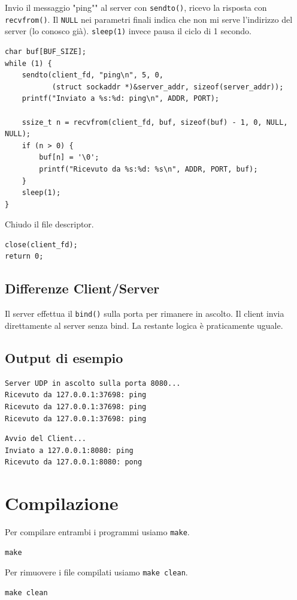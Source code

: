 \documentclass[a4paper,12pt]{article}
\begin{document}
\newpage
Invio il messaggio "ping"" al server con \texttt{sendto()},
ricevo la risposta con \texttt{recvfrom()}.
Il \texttt{NULL} nei parametri finali indica che non mi serve l'indirizzo
del server (lo conosco già).
\newline
\texttt{sleep(1)} invece pausa il ciclo di 1 secondo.
\begin{lstlisting}[caption={client\_udp.c - Invio/Ricezione}]
char buf[BUF_SIZE];
while (1) {
    sendto(client_fd, "ping\n", 5, 0,
           (struct sockaddr *)&server_addr, sizeof(server_addr));
    printf("Inviato a %s:%d: ping\n", ADDR, PORT);
    
    ssize_t n = recvfrom(client_fd, buf, sizeof(buf) - 1, 0, NULL, NULL);
    if (n > 0) {
        buf[n] = '\0';
        printf("Ricevuto da %s:%d: %s\n", ADDR, PORT, buf);
    }
    sleep(1);
}
\end{lstlisting}
\FloatBarrier

Chiudo il file descriptor.
\begin{lstlisting}[caption={client\_udp.c - Chiusura}]
close(client_fd);
return 0;
\end{lstlisting}
\FloatBarrier

\subsection{Differenze Client/Server}
Il server effettua il \texttt{bind()} sulla porta per rimanere in ascolto. Il client invia direttamente al server senza bind. La restante logica è praticamente uguale.

\subsection{Output di esempio}
\begin{lstlisting}[caption={Output server}]
Server UDP in ascolto sulla porta 8080...
Ricevuto da 127.0.0.1:37698: ping
Ricevuto da 127.0.0.1:37698: ping
Ricevuto da 127.0.0.1:37698: ping
\end{lstlisting}
\FloatBarrier

\begin{lstlisting}[caption={Output client}]
Avvio del Client...
Inviato a 127.0.0.1:8080: ping
Ricevuto da 127.0.0.1:8080: pong
\end{lstlisting}
\FloatBarrier

\section{Compilazione}
Per compilare entrambi i programmi usiamo \texttt{make}.
\begin{lstlisting}[caption={Compilazione}]
make
\end{lstlisting}
\FloatBarrier
Per rimuovere i file compilati usiamo \texttt{make clean}.
\begin{lstlisting}[caption={Clean}]
make clean
\end{lstlisting}
\FloatBarrier
\end{document}
